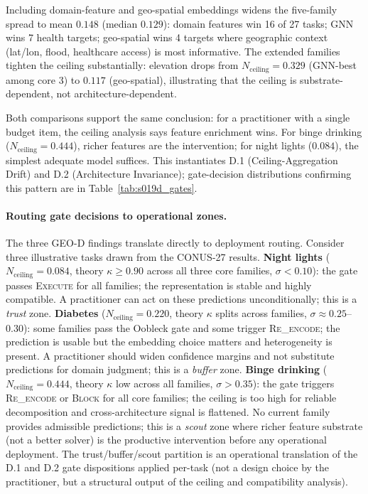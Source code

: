 \documentclass{article}
\begin{document}
Including domain-feature and geo-spatial embeddings widens the five-family spread to mean $0.148$ (median $0.129$): domain features win 16 of 27 tasks; GNN wins 7 health targets; geo-spatial wins 4 targets where geographic context (lat/lon, flood, healthcare access) is most informative. The extended families tighten the ceiling substantially: elevation drops from $N_{\text{ceiling}} = 0.329$ (GNN-best among core 3) to $0.117$ (geo-spatial), illustrating that the ceiling is substrate-dependent, not architecture-dependent.

Both comparisons support the same conclusion: for a practitioner with a single budget item, the ceiling analysis says feature enrichment wins. For binge drinking ($N_{\text{ceiling}}{=}0.444$), richer features are the intervention; for night lights ($0.084$), the simplest adequate model suffices. This instantiates D.1 (Ceiling-Aggregation Drift) and D.2 (Architecture Invariance); gate-decision distributions confirming this pattern are in Table~\ref{tab:s019d_gates}.

\paragraph{Routing gate decisions to operational zones.}
The three GEO-D findings translate directly to deployment routing. Consider three illustrative tasks drawn from the CONUS-27 results. \textbf{Night lights} ($N_{\text{ceiling}} = 0.084$, theory $\kappa \geq 0.90$ across all three core families, $\sigma < 0.10$): the gate passes \textsc{Execute} for all families; the representation is stable and highly compatible. A practitioner can act on these predictions unconditionally; this is a \emph{trust} zone. \textbf{Diabetes} ($N_{\text{ceiling}} = 0.220$, theory $\kappa$ splits across families, $\sigma \approx 0.25$--$0.30$): some families pass the Oobleck gate and some trigger \textsc{Re\_encode}; the prediction is usable but the embedding choice matters and heterogeneity is present. A practitioner should widen confidence margins and not substitute predictions for domain judgment; this is a \emph{buffer} zone. \textbf{Binge drinking} ($N_{\text{ceiling}} = 0.444$, theory $\kappa$ low across all families, $\sigma > 0.35$): the gate triggers \textsc{Re\_encode} or \textsc{Block} for all core families; the ceiling is too high for reliable decomposition and cross-architecture signal is flattened. No current family provides admissible predictions; this is a \emph{scout} zone where richer feature substrate (not a better solver) is the productive intervention before any operational deployment.
The trust/buffer/scout partition is an operational translation of the D.1 and D.2 gate dispositions applied per-task (not a design choice by the practitioner, but a structural output of the ceiling and compatibility analysis).
\end{document}
